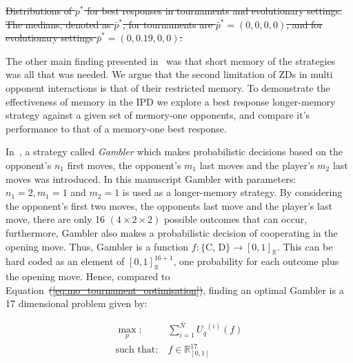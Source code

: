 \documentclass[fleqn,10pt]{wlscirep}
\newcommand{\R}{\mathbb{R}}
\providecommand{\DIFadd}[1]{{\protect\color{blue}\uwave{#1}}} %
\providecommand{\DIFdel}[1]{{\protect\color{red}\sout{#1}}}                      %
\providecommand{\DIFaddbegin}{} %
\providecommand{\DIFaddend}{} %
\providecommand{\DIFdelbegin}{} %
\providecommand{\DIFdelend}{} %
\providecommand{\DIFdelFL}[1]{\DIFdel{#1}} %
\begin{document}
\DIFdelbegin %
{%
\DIFdelFL{Distributions of \(p^*\) for best responses in tournaments and
    evolutionary settings. The medians, denoted as \(\bar{p}^*\), for tournaments
    are \(\bar{p}^* = (0, 0, 0, 0)\), and for evolutionary settings
    \(\bar{p}^* = (0, 0.19, 0, 0)\). }%
}

\DIFdelend The other main finding presented in~\cite{Press2012} was that
short memory of the strategies was all that was needed.
We argue that the second limitation of ZDs in multi opponent
interactions is that of their restricted memory.
To demonstrate the effectiveness of memory in the IPD we explore a best response
longer-memory strategy against a given set of memory-one opponents,  and compare
it's performance to that of a memory-one best response.

In~\cite{Harper2017}, a strategy called \textit{Gambler} which makes
probabilistic decisions based on the opponent's \(n_1\) first moves, the
opponent's \(m_1\) last moves and the player's \(m_2\) last moves was
introduced. In this manuscript Gambler with parameters: $n_1 = 2, m_1 = 1$ and $m_2 = 1$ is used
as a longer-memory strategy.
By considering the opponent's first two moves, the opponents last move and the
player's last move, there are only 16 $(4 \times 2 \times 2)$ possible outcomes
that can occur, furthermore, Gambler also makes a probabilistic decision of
cooperating in the opening move. Thus, Gambler is a function \(f: \{\text{C,
D}\} \rightarrow [0, 1]_{\R}\). This can be hard coded as an element
of \([0, 1]_{\R} ^ {16 + 1}\), one probability for each outcome plus the opening
move. Hence, compared to Equation~\DIFdelbegin \DIFdel{(\ref{eq:mo_tournament_optimisation})}\DIFdelend \DIFaddbegin \DIFadd{\ref{eq:mo_tournament_optimisation}}\DIFaddend , finding an
optimal Gambler is a 17 dimensional problem given by:

\begin{equation}\label{eq:gambler_optimisation}
    \begin{aligned}
    \max_p: & \ \sum_{i=1} ^ {N} {U_q}^{(i)} (f)
    \\
    \text{such that}: & \ f \in \R_{[0, 1]}^{17}
    \end{aligned}
\end{equation}
\end{document}
